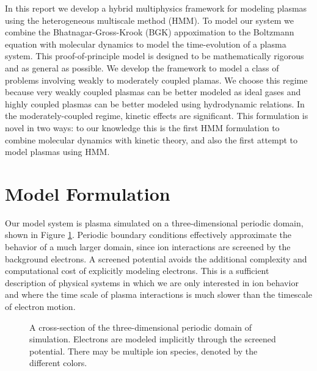 \documentclass{article}
\begin{document}
In this report we develop a hybrid multiphysics framework for modeling plasmas using the heterogeneous multiscale method (HMM). To model our system we combine the Bhatnagar-Gross-Krook (BGK) appoximation to the Boltzmann equation with molecular dynamics to model the time-evolution of a plasma system. This proof-of-principle model is designed to be mathematically rigorous and as general as possible. We develop the framework to model a class of problems involving weakly to moderately coupled plamas. We choose this regime because very weakly coupled plasmas can be better modeled as ideal gases and highly coupled plasmas can be better modeled using hydrodynamic relations. In the moderately-coupled regime, kinetic effects are significant. This formulation is novel in two ways: to our knowledge this is the first HMM formulation to combine molecular dynamics with kinetic theory, and also the first attempt to model plasmas using HMM. %

\section{Model Formulation}

Our model system is plasma simulated on a three-dimensional periodic domain, shown in Figure \ref{OVITO}. Periodic boundary conditions effectively approximate the behavior of a much larger domain, since ion interactions are screened by the background electrons. A screened potential avoids the additional complexity and computational cost of explicitly modeling electrons. This is a sufficient description of physical systems in which we are only interested in ion behavior and where the time scale of plasma interactions is much slower than the timescale of electron motion.
\begin{figure}[h]
	\caption{A cross-section of the three-dimensional periodic domain of simulation. Electrons are modeled implicitly through the screened potential. There may be multiple ion species, denoted by the different colors.}
	\label{OVITO}
\end{figure}
\end{document}
